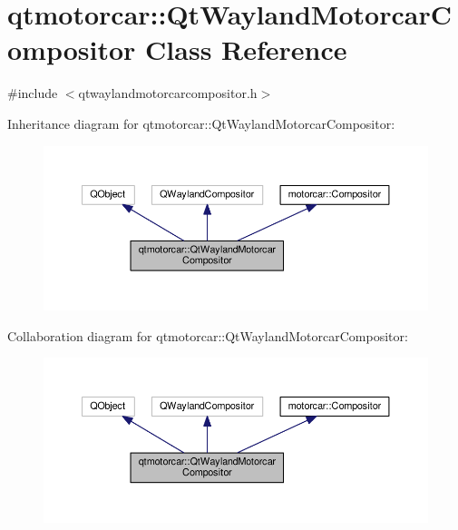 \hypertarget{classqtmotorcar_1_1QtWaylandMotorcarCompositor}{\section{qtmotorcar\-:\-:Qt\-Wayland\-Motorcar\-Compositor Class Reference}
\label{classqtmotorcar_1_1QtWaylandMotorcarCompositor}
}


{\ttfamily \#include $<$qtwaylandmotorcarcompositor.\-h$>$}



Inheritance diagram for qtmotorcar\-:\-:Qt\-Wayland\-Motorcar\-Compositor\-:
\nopagebreak
\begin{figure}[H]
\begin{center}
\leavevmode
\includegraphics[width=350pt]{classqtmotorcar_1_1QtWaylandMotorcarCompositor__inherit__graph}
\end{center}
\end{figure}


Collaboration diagram for qtmotorcar\-:\-:Qt\-Wayland\-Motorcar\-Compositor\-:
\nopagebreak
\begin{figure}[H]
\begin{center}
\leavevmode
\includegraphics[width=350pt]{classqtmotorcar_1_1QtWaylandMotorcarCompositor__coll__graph}
\end{center}
\end{figure}
